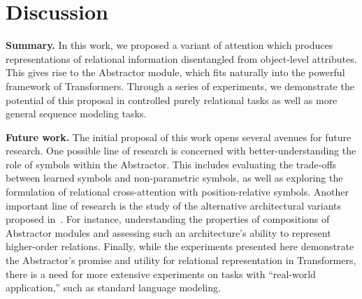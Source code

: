 \section{Discussion}\label{sec:discuss}


\textbf{Summary.} In this work, we proposed a variant of attention which produces representations of relational information disentangled from object-level attributes. This gives rise to the Abstractor module, which fits naturally into the powerful framework of Transformers. Through a series of experiments, we demonstrate the potential of this proposal in controlled purely relational tasks as well as more general sequence modeling tasks.

\textbf{Future work.} The initial proposal of this work opens several avenues for future research. One possible line of research is concerned with better-understanding the role of symbols within the Abstractor. This includes evaluating the trade-offs between learned symbols and non-parametric symbols, as well as exploring the formulation of relational cross-attention with position-relative symbols. Another important line of research is the study of the alternative architectural variants proposed in~. For instance, understanding the properties of compositions of Abstractor modules and assessing such an architecture's ability to represent higher-order relations. Finally, while the experiments presented here demonstrate the Abstractor's promise and utility for relational representation in Transformers, there is a need for more extensive experiments on tasks with ``real-world application,'' such as standard language modeling.